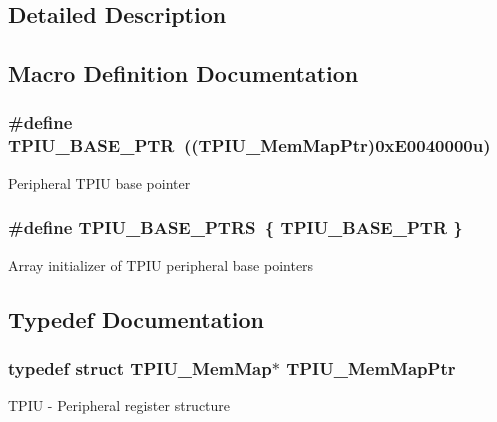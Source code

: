 \subsection{Detailed Description}


\subsection{Macro Definition Documentation}
\hypertarget{group___t_p_i_u___peripheral_ga9294dc3ec1881014ac83408db60de6a0}{}
\subsubsection[{T\+P\+I\+U\+\_\+\+B\+A\+S\+E\+\_\+\+P\+T\+R}]{\setlength{\rightskip}{0pt plus 5cm}\#define T\+P\+I\+U\+\_\+\+B\+A\+S\+E\+\_\+\+P\+T\+R~(({\bf T\+P\+I\+U\+\_\+\+Mem\+Map\+Ptr})0x\+E0040000u)}\label{group___t_p_i_u___peripheral_ga9294dc3ec1881014ac83408db60de6a0}
Peripheral T\+P\+I\+U base pointer \hypertarget{group___t_p_i_u___peripheral_ga3d9db14d6200532bc2307ba24bd4f4e9}{}
\subsubsection[{T\+P\+I\+U\+\_\+\+B\+A\+S\+E\+\_\+\+P\+T\+R\+S}]{\setlength{\rightskip}{0pt plus 5cm}\#define T\+P\+I\+U\+\_\+\+B\+A\+S\+E\+\_\+\+P\+T\+R\+S~\{ {\bf T\+P\+I\+U\+\_\+\+B\+A\+S\+E\+\_\+\+P\+T\+R} \}}\label{group___t_p_i_u___peripheral_ga3d9db14d6200532bc2307ba24bd4f4e9}
Array initializer of T\+P\+I\+U peripheral base pointers 

\subsection{Typedef Documentation}
\hypertarget{group___t_p_i_u___peripheral_ga300f3eea21a542970734e2c9c0953f4f}{}
\subsubsection[{T\+P\+I\+U\+\_\+\+Mem\+Map\+Ptr}]{\setlength{\rightskip}{0pt plus 5cm}typedef struct {\bf T\+P\+I\+U\+\_\+\+Mem\+Map}$\ast$ {\bf T\+P\+I\+U\+\_\+\+Mem\+Map\+Ptr}}\label{group___t_p_i_u___peripheral_ga300f3eea21a542970734e2c9c0953f4f}
T\+P\+I\+U -\/ Peripheral register structure 